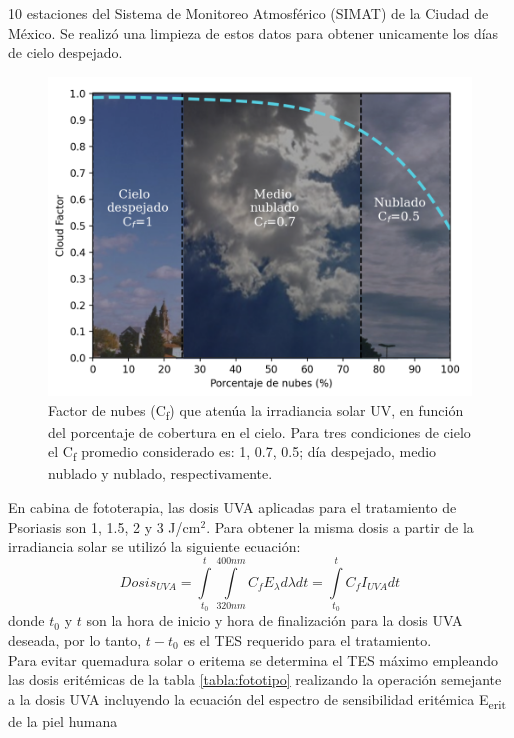 \documentclass{article}
\begin{document}
\begin{multicols}{2}
 10 estaciones del Sistema de Monitoreo Atmosférico (SIMAT) de la Ciudad de México. Se realizó una limpieza de estos datos para
 obtener unicamente los días de cielo despejado.\\
 \begin{figure}[H]
    \centering
    \includegraphics[scale=0.68]{images/nubes.png}
    \caption{Factor de nubes (C\textsubscript{f}) que atenúa la irradiancia solar UV, en función del porcentaje de cobertura en el cielo.
     Para tres condiciones de cielo el C\textsubscript{f} promedio considerado es: 1, 0.7, 0.5; día despejado, 
     medio nublado y nublado, respectivamente.}
    \label{fig:cloud}
\end{figure}
En cabina de fototerapia, las dosis UVA aplicadas para el tratamiento de Psoriasis son 1, 1.5, 2 y 3 J/cm$^2$. 
Para obtener la misma dosis a partir de la irradiancia solar se utilizó la siguiente ecuación:
\begin{equation*}
    Dosis_{UVA}=\int\limits_{t_0}^t\int\limits_{320nm}^{400nm} C_f E_{\lambda} d\lambda dt =\int\limits_{t_0}^{t} C_f I_{UVA}dt
\end{equation*}
donde $t_0$ y $t$ son la hora de inicio y hora de finalización para la dosis UVA deseada, 
por lo tanto, $t-t_0$ es el TES requerido para el tratamiento.\\ Para evitar quemadura solar o eritema se determina el TES máximo 
empleando las dosis eritémicas de la tabla \ref{tabla:fototipo} realizando la operación semejante a la dosis UVA incluyendo la ecuación del espectro de sensibilidad eritémica E\textsubscript{erit} de la piel humana
\begin{equation*}

\end{equation*}
\end{multicols}
\end{document}
